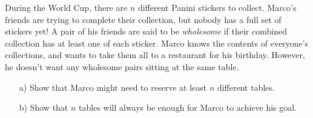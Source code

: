 During the World Cup, there are $n$ different Panini stickers to collect.
Marco's friends are trying to complete their collection, but nobody has a full set of stickers yet!
A pair of his friends are said to be \emph{wholesome} if
their combined collection has at least one of each sticker.
Marco knows the contents of everyone's collections,
and wants to take them all to a restaurant for his birthday.
However, he doesn't want any wholesome pairs sitting at the same table. 
\begin{enumerate}
    \item[a)] Show that Marco might need to reserve at least $n$ different tables.
    \item[b)] Show that $n$ tables will always be enough for Marco to achieve his goal.
\end{enumerate}
